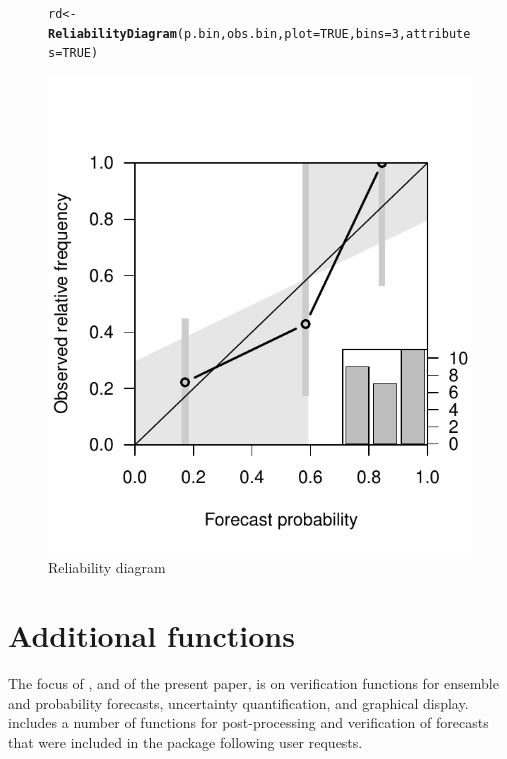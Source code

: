 \documentclass[article]{jss}\usepackage{graphicx, color}
\makeatletter
\def\maxwidth{ %
  \ifdim\Gin@nat@width>\linewidth
    \linewidth
  \else
    \Gin@nat@width
  \fi
}
\newcommand{\hlfunctioncall}[1]{\textcolor[rgb]{0,0.501960784313725,0.752941176470588}{\textbf{#1}}}%
\newenvironment{kframe}{%
 \def\at@end@of@kframe{}%
 \ifinner\ifhmode%
  \def\at@end@of@kframe{\end{minipage}}%
  \begin{minipage}{\columnwidth}%
 \fi\fi%
 \def\FrameCommand##1{\hskip\@totalleftmargin \hskip-\fboxsep
 \colorbox{shadecolor}{##1}\hskip-\fboxsep
     \hskip-\linewidth \hskip-\@totalleftmargin \hskip\columnwidth}%
 \MakeFramed {\advance\hsize-\width
   \@totalleftmargin\z@ \linewidth\hsize
   \@setminipage}}%
 {\par\unskip\endMakeFramed%
 \at@end@of@kframe}
\newenvironment{knitrout}{}{} %
\makeatother
\begin{document}
\begin{figure}
\begin{center}
%
\begin{knitrout}
\color{fgcolor}\begin{kframe}
\begin{alltt}
rd <- \hlfunctioncall{ReliabilityDiagram}(p.bin, obs.bin, plot=TRUE, bins=3, attributes=TRUE)
\end{alltt}
\end{kframe}
\includegraphics[width=\maxwidth]{figure/reldiag} 

\end{knitrout}

%
\end{center}
\caption{Reliability diagram}
\label{reldiag-plot}
\end{figure}


\section{Additional functions}

The focus of , and of the present paper, is on verification functions for ensemble and probability forecasts, uncertainty quantification, and graphical display.
 includes a number of functions for post-processing and verification of forecasts that were included in the package following user requests.
\end{document}
